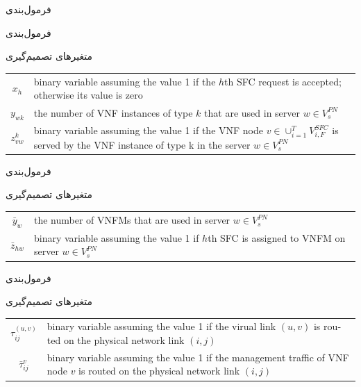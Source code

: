\documentclass{beamer}
\begin{document}
\begin{persian}
\begin{frame}{فرمول‌بندی}
\end{frame}
\begin{frame}{فرمول‌بندی}
    \par
    متغیرهای تصمیم‌گیری
    \begin{latin}\begin{tabular}{c p{10cm}}
        $x_h$ & binary variable assuming the value 1 if the $h$th SFC request is accepted; otherwise its value is zero \\
        $y_{wk}$ & the number of VNF instances of type $k$ that are used in server $w \in V_s^{PN}$ \\
        $z^k_{vw}$ & binary variable assuming the value 1 if the VNF node $v \in \cup_{i=1}^{T} V_{i, F}^{SFC}$ is served by the VNF instance of type k in the server $w \in V_s^{PN}$ \\
    \end{tabular}\end{latin}
\end{frame}
\begin{frame}{فرمول‌بندی}
    \par
    متغیرهای تصمیم‌گیری
    \begin{latin}\begin{tabular}{c p{10cm}}
        $\bar{y}_w$ & the number of VNFMs that are used in server $w \in V_s^{PN}$\\
        $\bar{z}_{hw}$ & binary variable assuming the value 1 if $h$th SFC is assigned to VNFM on server $w \in V_s^{PN}$\\
    \end{tabular}\end{latin}
\end{frame}
\begin{frame}{فرمول‌بندی}
    \par
    متغیرهای تصمیم‌گیری
    \begin{latin}\begin{tabular}{c p{10cm}}
        $\tau^{(u,v)}_{ij}$ & binary variable assuming the value 1 if the virual link $(u,v)$ is routed on the physical network link $(i,j)$\\
        $\bar{\tau}^{v}_{ij}$ & binary variable assuming the value 1 if the management traffic of VNF node $v$ is routed on the physical network link $(i,j)$\\

\end{tabular}
\end{latin}
\end{frame}
\end{persian}
\end{document}
